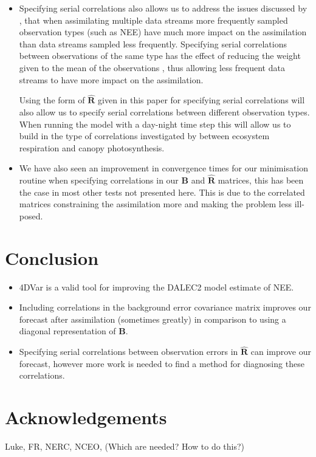 \documentclass[11pt]{article}
\begin{document}
\begin{itemize}
\item Specifying serial correlations also allows us to address the issues discussed by \citet{richardson2010estimating}, that when assimilating multiple data streams more frequently sampled observation types (such as NEE) have much more impact on the assimilation than data streams sampled less frequently. Specifying serial correlations between observations of the same type has the effect of reducing the weight given to the mean of the observations \citep{jarvinen1999variational}, thus allowing less frequent data streams to have more impact on the assimilation. 

Using the form of $\hat{\mathbf{R}}$ given in this paper for specifying serial correlations will also allow us to specify serial correlations between different observation types. When running the model with a day-night time step this will allow us to build in the type of correlations investigated by \citet{Baldocchi2015} between ecosystem respiration and canopy photosynthesis.

\item We have also seen an improvement in convergence times for our minimisation routine when specifying correlations in our $\textbf{B}$ and $\hat{\mathbf{R}}$ matrices, this has been the case in most other tests not presented here. This is due to the correlated matrices constraining the assimilation more and making the problem less ill-posed.
\end{itemize} 

\section{Conclusion}

\begin{itemize}
\item 4DVar is a valid tool for improving the DALEC2 model estimate of NEE.
\item Including correlations in the background error covariance matrix improves our forecast after assimilation (sometimes greatly) in comparison to using a diagonal representation of $\textbf{B}$.
\item Specifying serial correlations between observation errors in $\hat{\textbf{R}}$ can improve our forecast, however more work is needed to find a method for diagnosing these correlations.
\end{itemize}

\section{Acknowledgements}
Luke, FR, NERC, NCEO, (Which are needed? How to do this?)
\end{document}
